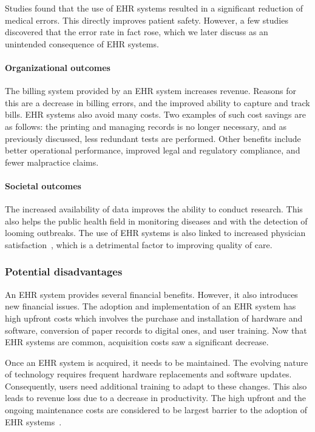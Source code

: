         Studies found that the use of EHR systems resulted in a significant reduction of medical errors. This directly improves patient safety. However, a few studies discovered that the error rate in fact rose, which we later discuss as an unintended consequence of EHR systems.

        \paragraph{Organizational outcomes} The billing system provided by an EHR system increases revenue. Reasons for this are a decrease in billing errors, and the improved ability to capture and track bills. EHR systems also avoid many costs. Two examples of such cost savings are as follows: the printing and managing records is no longer necessary, and as previously discussed, less redundant tests are performed. Other benefits include better operational performance, improved legal and regulatory compliance, and fewer malpractice claims.

        \paragraph{Societal outcomes} The increased availability of data improves the ability to conduct research. This also helps the public health field in monitoring diseases and with the detection of looming outbreaks. The use of EHR systems is also linked to increased physician satisfaction~\cite{Menachemi2009}, which is a detrimental factor to improving quality of care.

        \subsubsection{Potential disadvantages}\label{ehrs_disadvantages}

        An EHR system provides several financial benefits. However, it also introduces new financial issues. The adoption and implementation of an EHR system has high upfront costs which involves the purchase and installation of hardware and software, conversion of paper records to digital ones, and user training. Now that EHR systems are common, acquisition costs saw a significant decrease.

        Once an EHR system is acquired, it needs to be maintained. The evolving nature of technology requires frequent hardware replacements and software updates. Consequently, users need additional training to adapt to these changes. This also leads to revenue loss due to a decrease in productivity. The high upfront and the ongoing maintenance costs are considered to be largest barrier to the adoption of EHR systems~\cite{Menachemi2006}.

